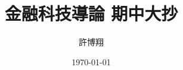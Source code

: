 \settowidth{\parindent}{一二}

\title{金融科技導論 期中大抄}
\author{許博翔}
\date{\today}
\thispagestyle{empty}
\setcounter{page}{1}
\pagestyle{empty}

\renewcommand{\sectionmark}[1]{\markright{#1}}
\renewcommand{\subsectionmark}[1]{}

\lhead{\thetitle}
\chead{}
\rhead{}
\cfoot{}
\rfoot{\thepage}
\renewcommand{\headrulewidth}{0.4pt}
\renewcommand{\footrulewidth}{0.4pt}



\newpage
